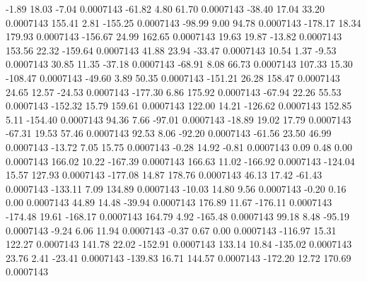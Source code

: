        -1.89       18.03       -7.04     0.0007143
      -61.82        4.80       61.70     0.0007143
      -38.40       17.04       33.20     0.0007143
      155.41        2.81     -155.25     0.0007143
      -98.99        9.00       94.78     0.0007143
     -178.17       18.34      179.93     0.0007143
     -156.67       24.99      162.65     0.0007143
       19.63       19.87      -13.82     0.0007143
      153.56       22.32     -159.64     0.0007143
       41.88       23.94      -33.47     0.0007143
       10.54        1.37       -9.53     0.0007143
       30.85       11.35      -37.18     0.0007143
      -68.91        8.08       66.73     0.0007143
      107.33       15.30     -108.47     0.0007143
      -49.60        3.89       50.35     0.0007143
     -151.21       26.28      158.47     0.0007143
       24.65       12.57      -24.53     0.0007143
     -177.30        6.86      175.92     0.0007143
      -67.94       22.26       55.53     0.0007143
     -152.32       15.79      159.61     0.0007143
      122.00       14.21     -126.62     0.0007143
      152.85        5.11     -154.40     0.0007143
       94.36        7.66      -97.01     0.0007143
      -18.89       19.02       17.79     0.0007143
      -67.31       19.53       57.46     0.0007143
       92.53        8.06      -92.20     0.0007143
      -61.56       23.50       46.99     0.0007143
      -13.72        7.05       15.75     0.0007143
       -0.28       14.92       -0.81     0.0007143
        0.09        0.48        0.00     0.0007143
      166.02       10.22     -167.39     0.0007143
      166.63       11.02     -166.92     0.0007143
     -124.04       15.57      127.93     0.0007143
     -177.08       14.87      178.76     0.0007143
       46.13       17.42      -61.43     0.0007143
     -133.11        7.09      134.89     0.0007143
      -10.03       14.80        9.56     0.0007143
       -0.20        0.16        0.00     0.0007143
       44.89       14.48      -39.94     0.0007143
      176.89       11.67     -176.11     0.0007143
     -174.48       19.61     -168.17     0.0007143
      164.79        4.92     -165.48     0.0007143
       99.18        8.48      -95.19     0.0007143
       -9.24        6.06       11.94     0.0007143
       -0.37        0.67        0.00     0.0007143
     -116.97       15.31      122.27     0.0007143
      141.78       22.02     -152.91     0.0007143
      133.14       10.84     -135.02     0.0007143
       23.76        2.41      -23.41     0.0007143
     -139.83       16.71      144.57     0.0007143
     -172.20       12.72      170.69     0.0007143

